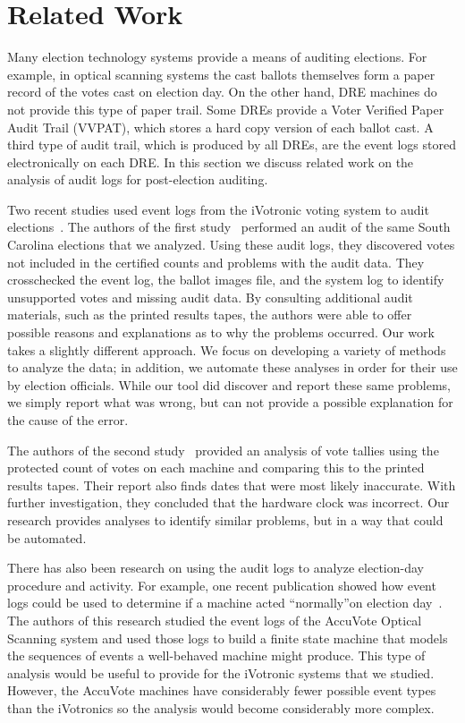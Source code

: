 \section{Related Work}
Many election technology systems provide a means of auditing elections. For example, in optical scanning systems the cast ballots themselves form a paper record of the votes cast on election day. On the other hand, DRE machines do not provide this type of paper trail. Some DREs provide a Voter Verified Paper Audit Trail (VVPAT), which stores a hard copy version of each ballot cast.  A third type of audit trail, which is produced by all DREs, are the event logs stored electronically on each DRE.  In this section we discuss related work on the analysis of audit logs for post-election auditing. 

Two recent studies used event logs from the iVotronic voting system to audit elections~\cite{Buell2011,Sandler2007}. The authors of the first study~\cite{Buell2011} performed an audit of the same South Carolina elections that we analyzed. Using these audit logs, they discovered votes not included in the certified counts and problems with the audit data. They crosschecked the event log, the ballot images file, and the system log to identify unsupported votes and missing audit data.  By consulting additional audit materials, such as the printed results tapes, the authors were able to offer possible reasons and explanations as to why the problems occurred. Our work takes a slightly different approach.  We focus on developing a variety of methods to analyze the data; in addition, we automate these analyses in order for their use by election officials.  While our tool did discover and report these same problems, we simply report what was wrong, but can not provide a possible explanation for the cause of the error. 

The authors of the second study~\cite{Sandler2007} provided an analysis of vote tallies using the protected count of votes on each machine and comparing this to the printed results tapes. Their report also finds dates that were most likely inaccurate.  With further investigation, they concluded that the hardware clock was incorrect. Our research provides analyses to identify similar problems, but in a way that could be automated. 

There has also been research on using the audit logs to analyze election-day procedure and activity. For example, one recent publication showed how event logs could be used to determine if a machine acted \textquotedblleft normally\textquotedblright on election day~\cite{Antonyan2009}. The authors of this research studied the event logs of the AccuVote Optical Scanning system and used those logs to build a finite state machine that models the sequences of events a well-behaved machine might produce. This type of analysis would be useful to provide for the iVotronic systems that we studied. However, the AccuVote machines have considerably fewer possible event types than the iVotronics so the analysis would become considerably more complex. 

